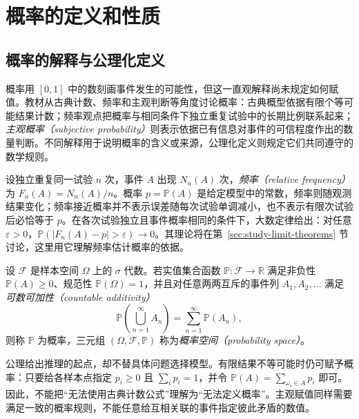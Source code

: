 \section{概率的定义和性质}
\label{sec:study-probability-definition}

\subsection{概率的解释与公理化定义}
\label{subsec:study-probability-axioms}

概率用 $[0,1]$ 中的数刻画事件发生的可能性，但这一直观解释尚未规定如何赋值。教材从古典计数、频率和主观判断等角度讨论概率：古典概型依据有限个等可能结果计数；频率观点把概率与相同条件下独立重复试验中的长期比例联系起来；\emph{主观概率（subjective probability）}则表示依据已有信息对事件的可信程度作出的数量判断。不同解释用于说明概率的含义或来源，公理化定义则规定它们共同遵守的数学规则。

设独立重复同一试验 $n$ 次，事件 $A$ 出现 $N_n(A)$ 次，\emph{频率（relative frequency）}为 $F_n(A)=N_n(A)/n$。概率 $p=\mathbb P(A)$ 是给定模型中的常数，频率则随观测结果变化；频率接近概率并不表示误差随每次试验单调减小，也不表示有限次试验后必恰等于 $p$。在各次试验独立且事件概率相同的条件下，大数定律给出：对任意 $\varepsilon>0$，$\mathbb P(|F_n(A)-p|>\varepsilon)\to0$。其理论将在第~\ref{sec:study-limit-theorems} 节讨论，这里用它理解频率估计概率的依据。

\begin{definition}
\label{def:study-probability-space}
设 $\mathcal F$ 是样本空间 $\Omega$ 上的 $\sigma$ 代数。若实值集合函数 $\mathbb P:\mathcal F\to\mathbb R$ 满足非负性 $\mathbb P(A)\ge0$、规范性 $\mathbb P(\Omega)=1$，并且对任意两两互斥的事件列 $A_1,A_2,\ldots$ 满足\emph{可数可加性（countable additivity）}
\begin{equation}
 \mathbb P\!\left(\bigcup_{n=1}^{\infty}A_n\right)
 =\sum_{n=1}^{\infty}\mathbb P(A_n),
 \label{eq:study-probability-axioms}
\end{equation}
则称 $\mathbb P$ 为概率，三元组 $(\Omega,\mathcal F,\mathbb P)$ 称为\emph{概率空间（probability space）}。
\end{definition}

公理给出推理的起点，却不替具体问题选择模型。有限结果不等可能时仍可赋予概率：只要给各样本点指定 $p_i\ge0$ 且 $\sum_i p_i=1$，并令 $\mathbb P(A)=\sum_{\omega_i\in A}p_i$ 即可。因此，不能把“无法使用古典计数公式”理解为“无法定义概率”。主观赋值同样需要满足一致的概率规则，不能任意给互相关联的事件指定彼此矛盾的数值。

